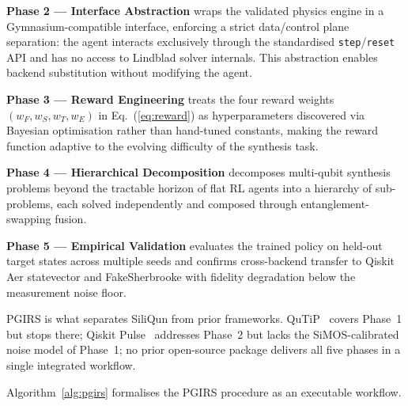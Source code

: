 \textbf{Phase 2 — Interface Abstraction} wraps the validated physics engine in a Gymnasium-compatible interface, enforcing a strict data/control plane separation: the agent interacts exclusively through the standardised \texttt{step}/\texttt{reset} API and has no access to Lindblad solver internals.
This abstraction enables backend substitution without modifying the agent.

\textbf{Phase 3 — Reward Engineering} treats the four reward weights $(w_F, w_S, w_T, w_E)$ in Eq.~(\ref{eq:reward}) as hyperparameters discovered via Bayesian optimisation rather than hand-tuned constants, making the reward function adaptive to the evolving difficulty of the synthesis task.

\textbf{Phase 4 — Hierarchical Decomposition} decomposes multi-qubit synthesis problems beyond the tractable horizon of flat RL agents into a hierarchy of sub-problems, each solved independently and composed through entanglement-swapping fusion.

\textbf{Phase 5 — Empirical Validation} evaluates the trained policy on held-out target states across multiple seeds and confirms cross-backend transfer to Qiskit Aer statevector and FakeSherbrooke with fidelity degradation below the measurement noise floor.

PGIRS is what separates SiliQun from prior frameworks. QuTiP~\cite{Lambert2024} covers Phase~1 but stops there; Qiskit Pulse~\cite{Alexander2020} addresses Phase~2 but lacks the SiMOS-calibrated noise model of Phase~1; no prior open-source package delivers all five phases in a single integrated workflow.

Algorithm~\ref{alg:pgirs} formalises the PGIRS procedure as an executable workflow.

